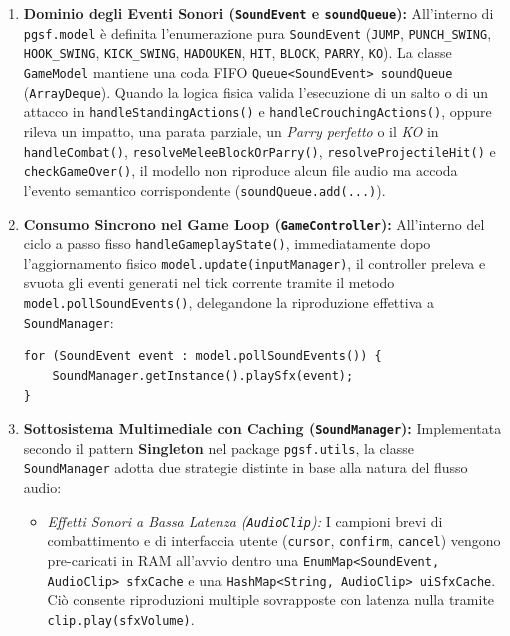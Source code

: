 \documentclass[11pt, a4paper]{article}
\begin{document}
\begin{enumerate}
    \item \textbf{Dominio degli Eventi Sonori (\texttt{SoundEvent} e \texttt{soundQueue}):} All'interno di \texttt{pgsf.model} è definita l'enumerazione pura \texttt{SoundEvent} (\texttt{JUMP}, \texttt{PUNCH\_SWING}, \texttt{HOOK\_SWING}, \texttt{KICK\_SWING}, \texttt{HADOUKEN}, \texttt{HIT}, \texttt{BLOCK}, \texttt{PARRY}, \texttt{KO}). La classe \texttt{GameModel} mantiene una coda FIFO \texttt{Queue<SoundEvent> soundQueue} (\texttt{ArrayDeque}). Quando la logica fisica valida l'esecuzione di un salto o di un attacco in \texttt{handleStandingActions()} e \texttt{handleCrouchingActions()}, oppure rileva un impatto, una parata parziale, un \emph{Parry perfetto} o il \emph{KO} in \texttt{handleCombat()}, \texttt{resolveMeleeBlockOrParry()}, \texttt{resolveProjectileHit()} e \texttt{checkGameOver()}, il modello non riproduce alcun file audio ma accoda l'evento semantico corrispondente (\texttt{soundQueue.add(...)}).
    \item \textbf{Consumo Sincrono nel Game Loop (\texttt{GameController}):} All'interno del ciclo a passo fisso \texttt{handleGameplayState()}, immediatamente dopo l'aggiornamento fisico \texttt{model.update(inputManager)}, il controller preleva e svuota gli eventi generati nel tick corrente tramite il metodo \texttt{model.pollSoundEvents()}, delegandone la riproduzione effettiva a \texttt{SoundManager}:
\begin{verbatim}
for (SoundEvent event : model.pollSoundEvents()) {
    SoundManager.getInstance().playSfx(event);
}
\end{verbatim}
    \item \textbf{Sottosistema Multimediale con Caching (\texttt{SoundManager}):} Implementata secondo il pattern \textbf{Singleton} nel package \texttt{pgsf.utils}, la classe \texttt{SoundManager} adotta due strategie distinte in base alla natura del flusso audio:
    \begin{itemize}
        \item \emph{Effetti Sonori a Bassa Latenza (\texttt{AudioClip}):} I campioni brevi di combattimento e di interfaccia utente (\texttt{cursor}, \texttt{confirm}, \texttt{cancel}) vengono pre-caricati in RAM all'avvio dentro una \texttt{EnumMap<SoundEvent, AudioClip> sfxCache} e una \texttt{HashMap<String, AudioClip> uiSfxCache}. Ciò consente riproduzioni multiple sovrapposte con latenza nulla tramite \texttt{clip.play(sfxVolume)}.

\end{itemize}
\end{enumerate}
\end{document}
